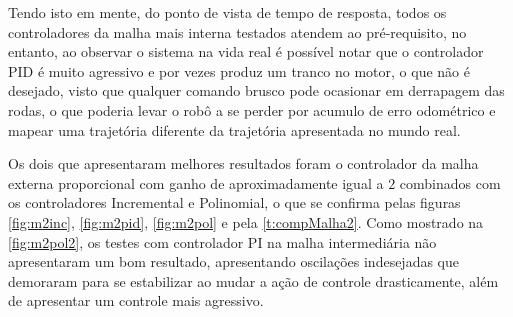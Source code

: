  Tendo isto em mente, %
 do ponto de vista de tempo de resposta, %
 todos os controladores da malha mais interna testados atendem ao pré-requisito, no entanto, ao observar o sistema na vida real é possível notar que o controlador PID é muito agressivo e por vezes produz um tranco no motor, o que não é desejado, visto que qualquer comando brusco pode ocasionar em derrapagem das rodas, o que poderia levar o robô a se perder por acumulo de erro odométrico e mapear uma trajetória diferente da trajetória apresentada no mundo real.
 
 Os dois que apresentaram melhores resultados foram o controlador da malha externa proporcional com ganho de aproximadamente igual a $2$ combinados com os controladores Incremental e Polinomial, o que se confirma pelas figuras \ref{fig:m2inc}, \ref{fig:m2pid}, \ref{fig:m2pol} e pela \autoref{t:compMalha2}. Como mostrado na \autoref{fig:m2pol2}, os testes com controlador PI na malha intermediária não apresentaram um bom resultado, apresentando oscilações indesejadas que demoraram para se estabilizar ao mudar a ação de controle drasticamente, além de apresentar um controle mais agressivo.
 
